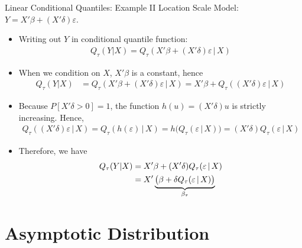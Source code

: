 \documentclass[aspectratio=169, handout]{beamer}
\begin{document}
{\footnotesize
\begin{frame}{Linear Conditional Quantiles: Example II}
Location Scale Model:
$Y = X'\beta + (X'\delta)\varepsilon$.
\begin{itemize}
  \item
    Writing out $Y$ in conditional quantile function:
    \begin{align*}
      Q_\tau(Y|X)
      =
      Q_\tau(X'\beta + (X'\delta)\varepsilon\,|\,X)
    \end{align*}

  \pause
  \item
    When we condition on $X$, $X'\beta$ is a constant, hence
    \begin{align*}
      Q_\tau(Y|X)
      &=
      Q_\tau(X'\beta + (X'\delta)\varepsilon\,|\,X)
      =
      X'\beta + Q_\tau((X'\delta)\varepsilon\,|\,X)
    \end{align*}

  \pause
  \item
    Because $P[X'\delta > 0]=1$, the function $h(u)=(X'\delta)u$ is
    strictly increasing.
    Hence,
    \begin{align*}
      Q_\tau( (X'\delta)\varepsilon\,|\,X)
      =
      Q_\tau(h(\varepsilon)\,|\,X)
      =
      h\big(
      Q_\tau(\varepsilon\,|\,X)
      \big)
      =
      (X'\delta)
      Q_\tau(\varepsilon\,|\,X)
    \end{align*}

  \pause
  \item
    Therefore, we have
    \begin{align*}
      Q_\tau(Y|X)
      &=
      X'\beta
      +
      (X'\delta)
      Q_\tau(\varepsilon\,|\,X)
      \\
      &=
      X'
      \underbrace{%
        \big(
        \beta
        +
        \delta
        Q_\tau(\varepsilon\,|\,X)
        \big)
      }_{\beta_\tau}
    \end{align*}
\end{itemize}
\end{frame}
}


\section{Asymptotic Distribution}
\end{document}
